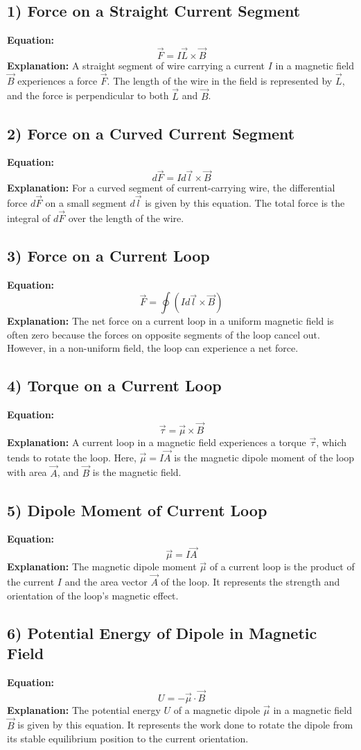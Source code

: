 \documentclass{article}
\begin{document}
\subsection*{1) Force on a Straight Current Segment}
\textbf{Equation:} 
\[ \vec{F} = I\vec{L} \times \vec{B} \]
\textbf{Explanation:} 
A straight segment of wire carrying a current \( I \) in a magnetic field \( \vec{B} \) experiences a force \( \vec{F} \). The length of the wire in the field is represented by \( \vec{L} \), and the force is perpendicular to both \( \vec{L} \) and \( \vec{B} \).

\subsection*{2) Force on a Curved Current Segment}
\textbf{Equation:} 
\[ d\vec{F} = I d\vec{l} \times \vec{B} \]
\textbf{Explanation:} 
For a curved segment of current-carrying wire, the differential force \( d\vec{F} \) on a small segment \( d\vec{l} \) is given by this equation. The total force is the integral of \( d\vec{F} \) over the length of the wire.

\subsection*{3) Force on a Current Loop}
\textbf{Equation:} 
\[ \vec{F} = \oint (I d\vec{l} \times \vec{B}) \]
\textbf{Explanation:} 
The net force on a current loop in a uniform magnetic field is often zero because the forces on opposite segments of the loop cancel out. However, in a non-uniform field, the loop can experience a net force.

\subsection*{4) Torque on a Current Loop}
\textbf{Equation:} 
\[ \vec{\tau} = \vec{\mu} \times \vec{B} \]
\textbf{Explanation:} 
A current loop in a magnetic field experiences a torque \( \vec{\tau} \), which tends to rotate the loop. Here, \( \vec{\mu} = I\vec{A} \) is the magnetic dipole moment of the loop with area \( \vec{A} \), and \( \vec{B} \) is the magnetic field.

\subsection*{5) Dipole Moment of Current Loop}
\textbf{Equation:} 
\[ \vec{\mu} = I\vec{A} \]
\textbf{Explanation:} 
The magnetic dipole moment \( \vec{\mu} \) of a current loop is the product of the current \( I \) and the area vector \( \vec{A} \) of the loop. It represents the strength and orientation of the loop's magnetic effect.

\subsection*{6) Potential Energy of Dipole in Magnetic Field}
\textbf{Equation:} 
\[ U = -\vec{\mu} \cdot \vec{B} \]
\textbf{Explanation:} 
The potential energy \( U \) of a magnetic dipole \( \vec{\mu} \) in a magnetic field \( \vec{B} \) is given by this equation. It represents the work done to rotate the dipole from its stable equilibrium position to the current orientation.
\end{document}
